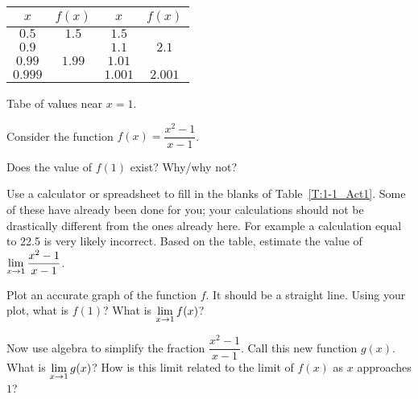 \begin{margintable}[6cm]
\begin{tabular}{c|c||c|c}
	$x$ & $f(x)$ & $x$ & $f(x)$ \\ \hline
	$0.5$ & $1.5$ & $1.5$ & \hspace{.75in} \\
	$0.9$ & \hspace{.75in} & $1.1$ & $2.1$ \\
	$0.99$ & $1.99$ & $1.01$ & \hspace{.75in} \\
	$0.999$ & \hspace{.75in} & $1.001$ & $2.001$ \\
\end{tabular}
\caption{Tabe of values near $x=1$.}
\label{T:1-1_Act1}
\end{margintable}

\begin{activity} \label{A:1.1.1}  Consider the function $f(x) = \dfrac{x^2 - 1}{x - 1}$.
\ba
\item Does the value of $f(1)$ exist? Why/why not?

\item Use a calculator or spreadsheet to fill in the blanks of Table~\ref{T:1-1_Act1}. Some of these have already been done for you; your calculations should not be drastically different from the ones already here. For example a calculation equal to 22.5 is very likely incorrect. Based on the table, estimate the value of $\displaystyle \lim_{x \to 1} \frac{x^2 - 1}{x-1}$. 

\item Plot an accurate graph of the function $f$.  It should be a straight line.  Using your plot, what is $f(1)$?  What is $\displaystyle \lim_{x \to 1} f(x)$?

\item Now use algebra to simplify the fraction $\dfrac{x^2 - 1}{x - 1}$. Call this new function $g(x)$.  What is $\displaystyle \lim_{x \to 1} g(x)$? How is this limit related to the limit of $f(x)$ as $x$ approaches $1$?
\ea
\end{activity}

\aftera
